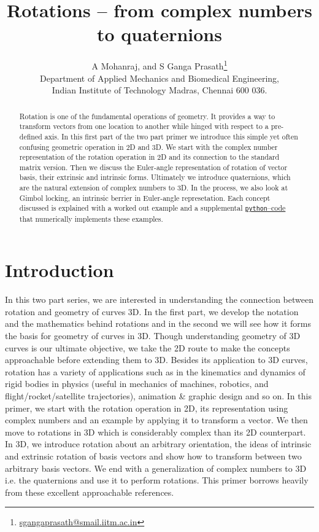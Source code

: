 \documentclass{article}
\title{Rotations -- from complex numbers to quaternions}
\author{A Mohanraj, and S Ganga Prasath\footnote{\href{emailto:sgangaprasath@smail.iitm.ac.in}{sgangaprasath@smail.iitm.ac.in}} \\
Department of Applied Mechanics and Biomedical Engineering,\\
Indian Institute of Technology Madras, Chennai 600 036.}
\date{}
\begin{document}
\maketitle
\begin{abstract}
Rotation is one of the fundamental operations of geometry. It provides a way to transform vectors from one location to another while hinged with respect to a pre-defined axis. In this first part of the two part primer we introduce this simple yet often confusing geometric operation in 2D and 3D. We start with the complex number representation of the rotation operation in 2D and its connection to the standard matrix version. Then we discuss the Euler-angle representation of rotation of vector basis, their extrinsic and intrinsic forms. Ultimately we introduce quaternions, which are the natural extension of complex numbers to 3D. In the process, we also look at Gimbol locking, an intrinsic berrier in Euler-angle represetation. Each concept discussed is explained with a worked out example and a supplemental \href{https://github.com/sgangaprasath/RotationTut/blob/main/Rotations.ipynb}{\texttt{python}--code} that numerically implements these examples.
\end{abstract}


\section{Introduction}
In this two part series, we are interested in understanding the connection between rotation and geometry of curves 3D. In the first part, we develop the notation and the mathematics behind rotations and in the second we will see how it forms the basis for geometry of curves in 3D. Though understanding geometry of 3D curves is our ultimate objective, we take the 2D route to make the concepts approachable before extending them to 3D. Besides its application to 3D curves, rotation has a variety of applications such as in the kinematics and dynamics of rigid bodies in physics (useful in mechanics of machines, robotics, and flight/rocket/satellite trajectories), animation \& graphic design and so on. In this primer, we start with the rotation operation in 2D, its representation using complex numbers and an example by applying it to transform a vector. We then move to rotations in 3D which is considerably complex than its 2D counterpart. In 3D, we introduce rotation about an arbitrary orientation, the ideas of intrinsic and extrinsic rotation of basis vectors and show how to transform between two arbitrary basis vectors. We end with a generalization of complex numbers to 3D i.e. the quaternions and use it to perform rotations. This primer borrows heavily from these \cite{hanson2005visualizing,vince2008geometric,vince2006mathematics} excellent approachable references.
\end{document}
